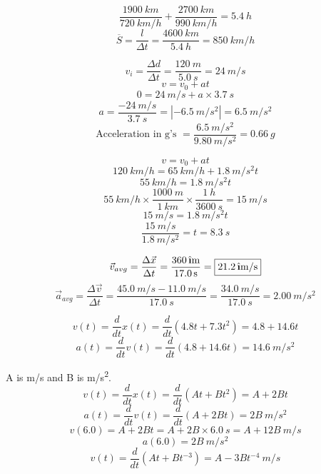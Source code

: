 \documentclass[11pt]{homework}
\newcommand{\ihat}{\hat{\textbf{\i}}}
\begin{document}
\setcounter{questionCounter}{13}
\question
  \[
    \frac{\qty{1900}{km}}{\qty{720}{km/h}} + \frac{\qty{2700}{km}}{\qty{990}{km/h}} = \qty{5.4}{h}
  \]
  \[
    \overline{S} = \frac{l}{\Delta t} = \frac{\qty{4600}{km}}{\qty{5.4}{h}} = \boxed{\qty{850}{km/h}}
  \]

\setcounter{questionCounter}{22}
\question
  \[
    v_i = \frac{\Delta d}{\Delta t} = \frac{\qty{120}{m}}{\qty{5.0}{s}} = \qty{24}{m/s}
  \]
  \[
    v = v_0 + at
  \]
  \[
    0 = \qty{24}{m/s} + a \times \qty{3.7}{s}
  \]
  \[
    a = \frac{\qty{-24}{m/s}}{\qty{3.7}{s}} = |\qty{-6.5}{m/s^2}| = \boxed{\qty{6.5}{m/s^2}}
  \]
  \[
    \mbox{Acceleration in g's } = \frac{\qty{6.5}{m/s^2}}{\qty{9.80}{m/s^2}} = \boxed{\qty{0.66}{g}}
  \]

\question
  \[
    v = v_0 + at
  \]
  \[
    \qty{120}{km/h} = \qty{65}{km/h} + \qty{1.8}{m/s^2}t
  \]
  \[
    \qty{55}{km/h} = \qty{1.8}{m/s^2}t
  \]
  \[
    \qty{55}{km/h} \times \frac{\qty{1000}{m}}{\qty{1}{km}} \times \frac{\qty{1}{h}}{\qty{3600}{s}} =  \qty{15}{m/s}
  \]
  \[
    \qty{15}{m/s} = \qty{1.8}{m/s^2}t
  \]
  \[
    \frac{\qty{15}{m/s}}{\qty{1.8}{m/s^2}} = t = \boxed{\qty{8.3}{s}}
  \]

\question
  \begin{alphaparts}
    \questionpart
      \[
        \vec v_{avg} = \frac{\Delta \vec x}{\Delta t} = \frac{\qty{360}{\ihat m}}{\qty{17.0}{s}} = \boxed{\qty{21.2}{\ihat m/s}}
      \]
    \questionpart
      \[
        \vec a_{avg} = \frac{\Delta \vec v}{\Delta t} = \frac{\qty{45.0}{m/s} - \qty{11.0}{m/s}}{\qty{17.0}{s}}   = \frac{\qty{34.0}{m/s}}{\qty{17.0}{s}} = \boxed{\qty{2.00}{m/s^2}}
      \]
  \end{alphaparts}
  
\question
  \[
    v(t) = \frac{d}{dt}x(t) = \frac{d}{dt}(4.8t + 7.3t^2) = 4.8 + 14.6t
  \]
  \[
    a(t) = \frac{d}{dt}v(t) = \frac{d}{dt}(4.8 + 14.6t) =  \boxed{\qty{14.6}{m/s^2}}
  \]

\question
  \begin{alphaparts}
    \questionpart
      A is \unit{m/s} and B is \unit{m/s^2}. 
    \questionpart
      \[
        v(t) = \frac{d}{dt}x(t) = \frac{d}{dt}(At + Bt^2) = A + 2Bt 
      \]
      \[
        a(t) = \frac{d}{dt}v(t) = \frac{d}{dt}(A + 2Bt) = \boxed{2B \: \unit{m/s^2}} 
      \]
    \questionpart
      \[
        v(6.0) = A + 2Bt = A + 2B \times \qty{6.0}{s} = \boxed{A + 12B \: \unit{m/s}}
      \]
      \[
        a(6.0) = \boxed{ 2B \: \unit{m/s^2}}
      \]
    \questionpart
      \[
        v(t) = \frac{d}{dt}(At + Bt^{-3}) =\boxed{ A - 3Bt^{-4} \: \unit{m/s}}
      \]
  \end{alphaparts}
\end{document}
